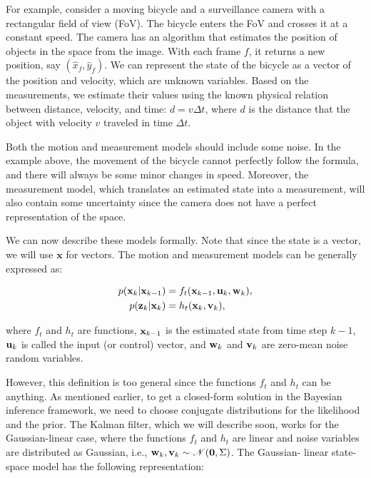 For example, consider a moving bicycle and a surveillance camera with a 
rectangular field of view (FoV). The bicycle enters the FoV and crosses it at a 
constant speed. The camera has an algorithm that estimates the position of 
objects in the space from the image. With each frame $f$, it returns a new 
position, say $(\hat x_f, \hat y_f)$. We can represent the state of the bicycle 
as a vector of the position and velocity, which are unknown variables. Based on 
the measurements, we estimate their values using the known physical relation 
between distance, velocity, and time: $d = v \Delta t$, where $d$ is the 
distance that the object with velocity $v$ traveled in time $\Delta t$.

Both the motion and measurement models should include some noise. In the 
example above, the movement of the bicycle cannot perfectly follow the formula, 
and there will always be some minor changes in speed. Moreover, the measurement 
model, which translates an estimated state into a measurement, will also 
contain some uncertainty since the camera does not have a perfect 
representation of the space.

We can now describe these models formally. Note that since the state is a 
vector, we will use $\mathbf{x}$ for vectors. The motion and measurement models 
can be generally expressed as:

\begin{align*}
    p(\vecat{x}{k} | \vecat{x}{k-1}) 
        &= f_t(\vecat{x}{k-1}, \vecat{u}{k}, \vecat{w}{k}), \\
    p(\vecat{z}{k} | \vecat{x}{k}) 
        &= h_t(\vecat{x}{k}, \vecat{v}{k}),
\end{align*}

where $f_t$ and $h_t$ are functions, $\vecat{x}{k-1}$ is the estimated state 
from time step $k-1$, $\vecat{u}{k}$ is called the input (or control) vector, 
and $\vecat{w}{k}$ and $\vecat{v}{k}$ are zero-mean noise random variables.

However, this definition is too general since the functions $f_t$ and $h_t$ can 
be anything. As mentioned earlier, to get a closed-form solution in the 
Bayesian inference framework, we need to choose conjugate distributions for the 
likelihood and the prior. The Kalman filter, which we will describe soon, works 
for the Gaussian-linear case, where the functions $f_t$ and $h_t$ are linear 
and noise variables are distributed as Gaussian, i.e., 
$\vecat{w}{k}, \vecat{v}{k} \sim \mathscr{N}(\mathbf{0}, \Sigma)$. The Gaussian-
linear state-space model has the following representation:

